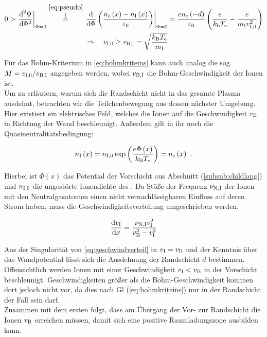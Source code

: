       \begin{align}
        0>\left.\frac{\diff^{2}\Psi}{\diff\Phi^{2}}\right|_{\Phi=0}\overset{\autoref{eq:pseudo}}{\overset{\mid}{=}}\left.\frac{\diff}{\diff\Phi}\left(\frac{n\ix{e}\left(x\right)-n\ix{I}\left(x\right)}{\varepsilon\ix{0}}\right)\right|_{\Phi=0}&=\frac{en\ix{e}\left(-d\right)}{\varepsilon\ix{0}}\left(\frac{e}{k\ix{b}T\ix{e}}-\frac{e}{m\ix{I}v\ix{I,0}^{2}}\right) \label{eq:beding} \\
        \Rightarrow \quad v\ix{I,0}\ge v\ix{B,I}=\sqrt{\frac{k\ix{B}T\ix{e}}{m\ix{I}}}& \label{eq:bohmkriteins}
      \end{align}


    Für das Bohm-Kriterium in \autoref{eq:bohmkriteins} kann auch analog die sog.  $M=v_\text{I,0}/v_\text{B,I}$ angegeben werden, wobei $v_\text{B,I}$ die Bohm-Geschwindigkeit der Ionen ist.\\
    Um zu erläutern, warum sich die Randschicht nicht in das gesamte Plasma ausdehnt, betrachten wir die Teilchenbewegung aus dessen nächster Umgebung. Hier existiert ein elektrisches Feld, welches die Ionen auf die Geschwindigkeit $v_\text{B}$ in Richtung der Wand beschleunigt. Außerdem gilt in ihr noch die Quasineutralitätsbedingung:

      \begin{align}
        n_\text{I}\left(x\right)=n_\text{I,0}\exp\left(\frac{e\Phi\left(x\right)}{k_\text{B}T_\text{e}}\right)=n_\text{e}\left(x\right)\,\, . \label{eq:bohmquasineutral}
      \end{align}

    Hierbei ist $\Phi\left(x\right)$ das Potential der Vorschicht aus Abschnitt (\ref{subsub:childlang}) und $n_\text{I,0}$ die ungestörte Ionendichte des . Da Stöße der Frequenz $\nu_\text{N,I}$ der Ionen mit den Neutralgasatomen einen nicht vernachlässigbaren Einfluss auf deren Strom haben, muss die Geschwindigkeitsverteilung umgeschrieben werden.

      \begin{align}
        \frac{\textnormal{d} v_\text{I}}{\textnormal{d} x}=\frac{\nu_\text{N,I}v_\text{I}^2}{v_\text{B}^2-v_\text{I}^2} \label{eq:geschwindverteil}
      \end{align}

    Aus der Singularität von \autoref{eq:geschwindverteil} in $v_\text{I}=v_\text{B}$ und der Kenntnis über das Wandpotential lässt sich die Ausdehnung der Randschicht $d$ bestimmen. Offensichtlich werden Ionen mit einer Geschwindigkeit $v_\text{I}<v_\text{B}$ in der Vorschicht beschleunigt. Geschwindigkeiten größer als die Bohm-Geschwindigkeit kommen dort jedoch nicht vor, da dies nach Gl (\ref{eq:bohmkriteins}) nur in der Randschicht der Fall sein darf. \\
    Zusammen mit dem ersten  folgt, dass am Übergang der Vor- zur Randschicht die Ionen $v_\text{B}$ erreichen müssen, damit sich eine positive Raumladungszone ausbilden kann.

